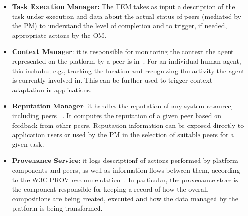 \begin{itemize}
\item \textbf{Task Execution Manager:} %
The TEM takes as input a description of the task under execution and data about the actual status of peers (mediated by the PM) to understand the level of completion and to trigger, if needed, appropriate actions by the OM.

\item \textbf{Context Manager}: it is responsible for monitoring the context the agent represented on the platform by a peer is in~\cite{D3.2}. For an individual human agent, this includes, e.g., tracking the location and recognizing the activity the agent is currently involved in. This can be further used to trigger context adaptation in applications. %

\item \textbf{Reputation Manager}: it handles the reputation of any system resource, including peers ~\cite{D2.3}. It computes the reputation of a given peer based on feedback from other peers. %
Reputation information can be exposed directly to application users or used by the PM in the selection of suitable peers for a given task. %


\item \textbf{Provenance Service}: it logs descriptionf of actions performed by platform
components and peers, as well as information flows between them, according to the W3C PROV recommendation~\cite{D2.2}. In particular, the provenance store is the component responsible for keeping a record of how the overall compositions are being created, executed and how the data managed by the platform is being transformed. %


\end{itemize}
